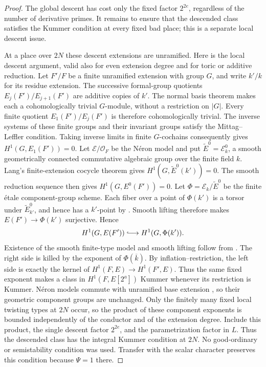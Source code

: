 \begin{proof}
The global descent has cost only the fixed factor $2^{2e}$, regardless
of the number of derivative primes. It remains to ensure that the
descended class satisfies the Kummer condition at every fixed bad place;
this is a separate local descent issue.

At a place over \(2N\) these descent extensions are unramified.
Here is the local descent argument, valid also for even extension degree
and for toric or additive reduction.  Let $F'/F$ be a finite unramified
extension with group $G$, and write $k'/k$ for its residue extension.
The successive formal-group quotients $E_j(F')/E_{j+1}(F')$ are additive
copies of $k'$.  The normal basis theorem makes each a cohomologically
trivial $G$-module, without a restriction on $|G|$.  Every finite
quotient $E_1(F')/E_j(F')$ is therefore cohomologically trivial.
The inverse systems of these finite groups and their invariant groups
satisfy the Mittag--Leffler condition.  Taking inverse limits in finite
$G$-cochains consequently gives $H^1(G,E_1(F'))=0$.
Let $\mathcal E/\mathcal O_F$ be the N\'eron model and put
$\widetilde E^0=\mathcal E_k^0$, a smooth geometrically connected
commutative algebraic group over the finite field $k$.
Lang's finite-extension cocycle theorem
\citep[Proposition~3, p.~559]{Lang1956} gives
$H^1(G,\widetilde E^0(k'))=0$.
The smooth reduction sequence then gives $H^1(G,E^0(F'))=0$.
Let $\Phi=\mathcal E_k/\widetilde E^0$ be the finite \'etale
component-group scheme. Each fiber over a point of $\Phi(k')$
is a torsor under $\widetilde E^0_{k'}$, and hence has a $k'$-point
by \citet[Theorem~2, pp.~557--558]{Lang1956}.
Smooth lifting therefore makes $E(F')\to\Phi(k')$ surjective. Hence
\[
 H^1(G,E(F'))\lhook\joinrel\longrightarrow
 H^1(G,\Phi(k')).
\]
Existence of the smooth finite-type model and smooth lifting follow from
\citet[Section~1.3, Corollary~2, and Section~2.3, Proposition~5]{BoschLutkebohmertRaynaud1990}.
The right side is killed by the exponent of $\Phi(\overline k)$.
By inflation--restriction, the left side is exactly the kernel of
$H^1(F,E)\to H^1(F',E)$.  Thus the same fixed exponent makes a
class in $H^1(F,E[2^a])$ Kummer whenever its restriction is Kummer.
N\'eron models commute with unramified base extension
\citep[Section~7.2, Theorem~1 and Corollary~2]{BoschLutkebohmertRaynaud1990},
so their geometric component groups are unchanged. Only the finitely many fixed local twisting
types at $2N$ occur, so the product of these component exponents is
bounded independently of the conductor and of the extension degree.
Include this product, the single descent factor $2^{2e}$, and the
parametrization factor in \(L\).  Thus the descended class has the
integral Kummer condition at \(2N\).
No good-ordinary or semistability condition was used.  Transfer with
the scalar character preserves this condition because \(\Psi=1\)
there.


\end{proof}

